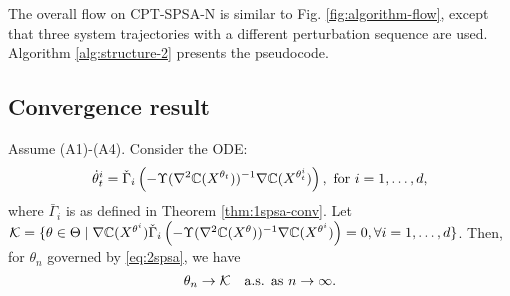 \documentclass{article}
\numberwithin{equation}{section}
\numberwithin{theorem}{section}
\begin{document}
The overall flow on CPT-SPSA-N is similar to Fig. \ref{fig:algorithm-flow}, except that three system trajectories with a different perturbation sequence are used. Algorithm \ref{alg:structure-2} presents the pseudocode.  

\subsection{Convergence result}
\begin{theorem}
\label{thm:2spsa}
Assume (A1)-(A4). 
Consider the ODE: 
$$
\dot\theta^{i}_t = \check\Gamma_{i}\left( - \Upsilon(\nabla^2 \mathbb{C}(X^{\theta_t}))^{-1} \nabla \mathbb{C}(X^{\theta^{i}_t}) \right), \text { for }i=1,\dots,d,$$
where 
$\bar\Gamma_{i}$ is as defined in Theorem \ref{thm:1spsa-conv}. Let $\mathcal{K} = \{\theta \in \Theta \mid
\nabla \mathbb{C}(X^{\theta^{i}})  \check\Gamma_{i}\left(-\Upsilon(\nabla^2 \mathbb{C}(X^{\theta}))^{-1} \nabla \mathbb{C}(X^{\theta^{i}})\right)
=0, \forall i=1,\ldots,d\}$. Then, for $\theta_n$ governed by \eqref{eq:2spsa}, 
we have
$$\theta_n \rightarrow \mathcal{K}  \text{~~ a.s. as } n\rightarrow \infty.$$ 
\end{theorem}
\end{document}
